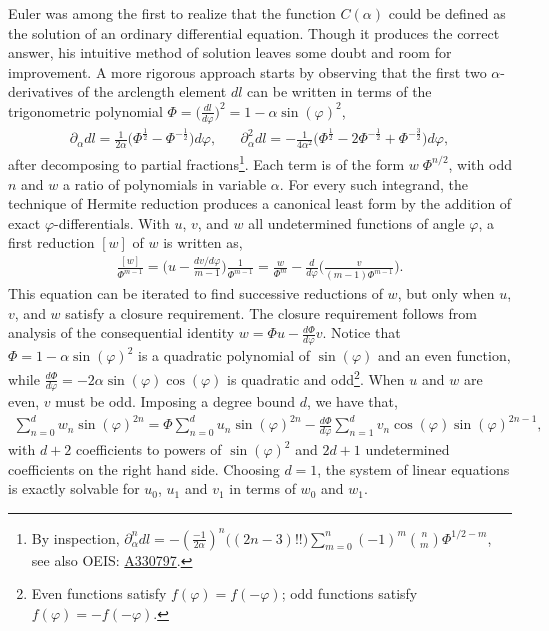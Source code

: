 \documentclass[nofootinbib,preprint]{revtex4-1}
\begin{document}
Euler was among the first to realize that the function $C(\alpha)$ could be defined as 
the solution of an ordinary differential equation. Though it produces the correct
answer, his intuitive method of solution leaves some doubt and room for improvement. 
A more rigorous approach starts by observing that the first two $\alpha$-derivatives of 
the arclength element $dl$ can be written in terms of the trigonometric polynomial 
$\Phi = \big(\frac{dl}{d\varphi}\big)^2 = 1-\alpha \sin(\varphi)^2$,
\begin{eqnarray}
\partial_{\alpha} dl = \frac{1}{2\alpha}\bigg(\Phi^{\frac{1}{2}} - \Phi^{-\frac{1}{2}} \bigg)d\varphi,
 \;\;\;\;\;\;
\partial_{\alpha}^2 dl = -\frac{1}{4\alpha^2}\bigg(\Phi^{\frac{1}{2}}
- 2\Phi^{-\frac{1}{2}} + \Phi^{-\frac{3}{2}} \bigg)d\varphi, 
 \nonumber
\end{eqnarray}
after decomposing to partial fractions\footnote{By inspection, 
$\partial_{\alpha}^n dl= -(\tfrac{-1}{2\alpha})^n \big( (2n-3)!! \big)
\sum_{m=0}^n(-1)^m\binom{n}{m} \Phi^{1/2-m}$, see also OEIS: \href{https://oeis.org/A330797}{A330797}.}. 
Each term is of the 
form $w\;\Phi^{n/2}$, with odd $n$ and $w$ a ratio of polynomials in variable $\alpha$. 
For every such integrand, the technique of Hermite reduction produces a canonical least 
form by the addition of exact $\varphi$-differentials.  With $u$, $v$, and $w$ all undetermined 
functions of angle $\varphi$, a first reduction $[w]$ of $w$ is written as, 
\begin{eqnarray}
\frac{[w]}{\Phi^{m-1}}=\Big(u-\frac{dv/d\varphi}{m-1}\Big)\frac{1}{\Phi^{m-1}} = 
\frac{w}{\Phi^{m}}-\frac{d}{d\varphi}\bigg( \frac{v}{(m-1)\Phi^{m-1}}\bigg). \nonumber
\end{eqnarray}
This equation can be iterated to find successive reductions of $w$, but only when $u$,$v$, 
and $w$ satisfy a closure requirement. The closure requirement follows from analysis of the consequential 
identity $w=\Phi u - \frac{d\Phi}{d\varphi} v$. Notice that $\Phi=1-\alpha \sin(\varphi)^2$ 
is a quadratic polynomial of $\sin(\varphi)$ and an even function, while 
$\frac{d\Phi}{d\varphi}=-2 \alpha \sin(\varphi)\cos(\varphi)$ is quadratic and odd\footnote{ 
Even functions satisfy $f(\varphi)=f(-\varphi)$; odd functions satisfy $f(\varphi)=-f(-\varphi)$.}. When 
$u$ and $w$ are even, $v$ must be odd. Imposing a degree bound $d$, we have that,
\begin{eqnarray}
\sum_{n=0}^{d} w_n \sin(\varphi)^{2n} =  \Phi \sum_{n=0}^{d} u_n \sin(\varphi)^{2n}
-\frac{d\Phi}{d\varphi}\sum_{n=1}^{d} v_n \cos(\varphi)\sin(\varphi)^{2n-1}, \nonumber
\end{eqnarray}
with $d+2$ coefficients to powers of $\sin(\varphi)^2$ and $2d+1$ undetermined 
coefficients on the right hand side. Choosing $d=1$, the system of linear equations
is exactly solvable for $u_0$, $u_1$ and $v_1$ in terms of $w_0$ and $w_1$.
\end{document}
